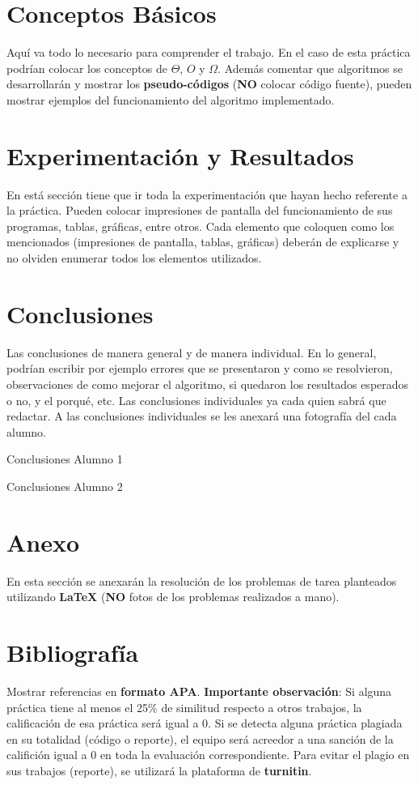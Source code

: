\documentclass[12pt,twoside]{article}
\begin{document}
\section{Conceptos B\'asicos}
Aqu\'i va todo lo necesario para comprender el trabajo. En el caso de esta pr\'actica podr\'ian colocar los conceptos de $\Theta$, $O$ y $\Omega$. Adem\'as comentar que algoritmos se desarrollar\'an y mostrar los \textbf{pseudo-c\'odigos} (\textbf{NO} colocar c\'odigo fuente), pueden mostrar ejemplos del funcionamiento del algoritmo implementado.

\section{Experimentaci\'on y Resultados}
En est\'a secci\'on tiene que ir toda la experimentaci\'on que hayan hecho referente a la pr\'actica. Pueden colocar impresiones de pantalla del funcionamiento de sus programas, tablas, gr\'aficas, entre otros. Cada elemento que coloquen como los mencionados (impresiones de pantalla, tablas, gr\'aficas) deber\'an de explicarse y no olviden enumerar todos los elementos utilizados.


\section{Conclusiones}
Las conclusiones de manera general y de manera individual. En lo general, podr\'ian escribir por ejemplo errores que se presentaron y como se resolvieron, observaciones de como mejorar el algoritmo, si quedaron los resultados esperados o no, y el porqu\'e, etc.
Las conclusiones individuales ya cada quien sabr\'a que redactar. A las conclusiones individuales se les anexar\'a una fotograf\'ia del cada alumno.

Conclusiones Alumno 1   

Conclusiones Alumno 2   




\section{Anexo}

En esta secci\'on se anexar\'an la resoluci\'on de los problemas de tarea planteados utilizando \textbf{LaTeX} (\textbf{NO} fotos de los problemas realizados a mano).




\section{Bibliograf\'ia}

Mostrar referencias en \textbf{formato APA}. \textbf{Importante observaci\'on}: Si alguna pr\'actica tiene al menos el 25$\%$ de similitud respecto a otros trabajos, la calificaci\'on de esa pr\'actica ser\'a igual a 0. Si se detecta alguna pr\'actica plagiada en su totalidad (c\'odigo o reporte), el equipo ser\'a acreedor a una sanci\'on de la califici\'on igual a 0 en toda la evaluaci\'on correspondiente. Para evitar el plagio en sus trabajos (reporte), se utilizar\'a la plataforma de \textbf{turnitin}.

\medskip
\end{document}
